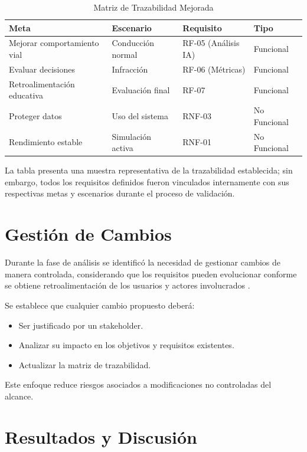 \documentclass[12pt]{article}
\begin{document}
	\begin{table}[H]
		\centering
		\caption{Matriz de Trazabilidad Mejorada}
		\label{tab:trazabilidad}
		\begin{tabular}{p{3cm} p{3cm} p{4cm} p{3cm}}
			\toprule
			\textbf{Meta} & \textbf{Escenario} & \textbf{Requisito} & \textbf{Tipo} \\
			\midrule
			Mejorar comportamiento vial & Conducción normal & RF-05 (Análisis IA) & Funcional \\
			Evaluar decisiones & Infracción & RF-06 (Métricas) & Funcional \\
			Retroalimentación educativa & Evaluación final & RF-07 & Funcional \\
			Proteger datos & Uso del sistema & RNF-03 & No Funcional \\
			Rendimiento estable & Simulación activa & RNF-01 & No Funcional \\
			\bottomrule
		\end{tabular}
	\end{table}
	
	La tabla presenta una muestra representativa de la trazabilidad establecida; sin embargo, todos los requisitos definidos fueron vinculados internamente con sus respectivas metas y escenarios durante el proceso de validación.
	
	\section{Gestión de Cambios}
	
	Durante la fase de análisis se identificó la necesidad de gestionar cambios de manera controlada, considerando que los requisitos pueden evolucionar conforme se obtiene retroalimentación de los usuarios y actores involucrados \cite{Wiegers2013}.
	
	Se establece que cualquier cambio propuesto deberá:
	\begin{itemize}
		\item Ser justificado por un stakeholder.
		\item Analizar su impacto en los objetivos y requisitos existentes.
		\item Actualizar la matriz de trazabilidad.
	\end{itemize}
	
	Este enfoque reduce riesgos asociados a modificaciones no controladas del alcance.
	
	\section{Resultados y Discusión}
	
\end{document}
